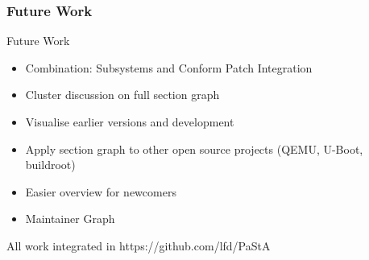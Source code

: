 \documentclass{beamer}
\begin{document}
	\begin{frame}
	\frametitle{Future Work}
		\begin{block}{Future Work}
			\begin{itemize}
				\item Combination: Subsystems and Conform Patch Integration
				\item Cluster discussion on full section graph
				\item Visualise earlier versions and development
				\item Apply section graph to other open source projects (QEMU, U-Boot, buildroot)
				\item Easier overview for newcomers
				\item Maintainer Graph
			\end{itemize}
		\end{block}

		All work integrated in https://github.com/lfd/PaStA
	\end{frame}
\end{document}
